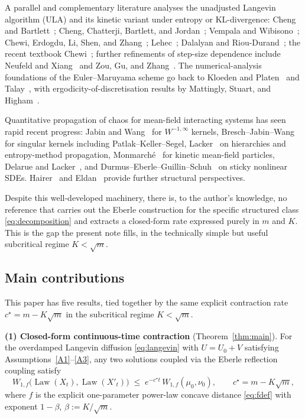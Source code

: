 \documentclass[11pt]{article}
\theoremstyle{definition}
\DeclareMathOperator{\Law}{Law}
\begin{document}
A parallel and complementary literature analyses the unadjusted Langevin algorithm (ULA) and its kinetic variant under entropy or KL-divergence: Cheng and Bartlett~\cite{ChengBartlett2018}; Cheng, Chatterji, Bartlett, and Jordan~\cite{ChengChatterjiBartlettJordan2018}; Vempala and Wibisono~\cite{VempalaWibisono2019}; Chewi, Erdogdu, Li, Shen, and Zhang~\cite{ChewiErdogduLi2022}; Lehec~\cite{LehecBook2023}; Dalalyan and Riou-Durand~\cite{DalalyanRiouTibbits2020}; the recent textbook Chewi~\cite{ChewiBook2024}; further refinements of step-size dependence include Neufeld and Xiang~\cite{NeufeldXiang2024} and Zou, Gu, and Zhang~\cite{ZouZhang2022}. The numerical-analysis foundations of the Euler--Maruyama scheme go back to Kloeden and Platen~\cite{KloedenPlaten1992} and Talay~\cite{Talay2002}, with ergodicity-of-discretisation results by Mattingly, Stuart, and Higham~\cite{Mattingly2002}.

Quantitative propagation of chaos for mean-field interacting systems has seen rapid recent progress: Jabin and Wang~\cite{JabinWang2018} for $W^{-1, \infty}$ kernels, Bresch--Jabin--Wang~\cite{BreschJabinWang2019} for singular kernels including Patlak--Keller--Segel, Lacker~\cite{Lacker2018,Lacker2023} on hierarchies and entropy-method propagation, Monmarch\'e~\cite{Monmarche2017} for kinetic mean-field particles, Delarue and Lacker~\cite{DelarueLacker2020}, and Durmus--Eberle--Guillin--Schuh~\cite{DurmusEberleGuillinSchuh2024} on sticky nonlinear SDEs. Hairer~\cite{Hairer2010} and Eldan~\cite{Eldan2013} provide further structural perspectives.

Despite this well-developed machinery, there is, to the author's knowledge, no reference that carries out the Eberle construction for the specific structured class \eqref{eq:decomposition} and extracts a closed-form rate expressed purely in $m$ and $K$. This is the gap the present note fills, in the technically simple but useful subcritical regime $K < \sqrt{m}$.

\subsection{Main contributions}

This paper has five results, tied together by the same explicit contraction rate $c^\star = m - K\sqrt m$ in the subcritical regime $K < \sqrt m$.

\smallskip

\textbf{(1) Closed-form continuous-time contraction} (Theorem~\ref{thm:main}). For the overdamped Langevin diffusion \eqref{eq:langevin} with $U = U_0 + V$ satisfying Assumptions~\ref{A1}--\ref{A3}, any two solutions coupled via the Eberle reflection coupling satisfy
\[
W_{1,f}\bigl(\Law(X_t), \Law(X'_t)\bigr) \;\le\; e^{-c^\star t}\, W_{1,f}(\mu_0, \nu_0), \qquad c^\star = m - K\sqrt m,
\]
where $f$ is the explicit one-parameter power-law concave distance \eqref{eq:fdef} with exponent $1 - \beta$, $\beta := K/\sqrt m$.
\end{document}
